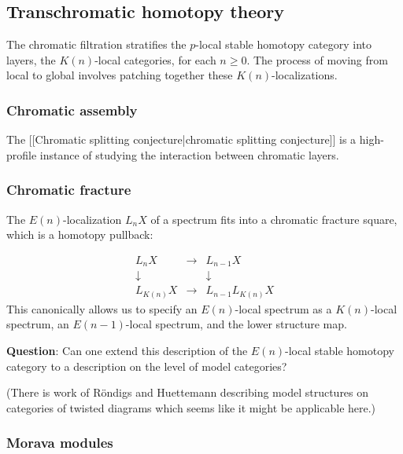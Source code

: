 \documentclass[12pt,titlepage]{article}
\theoremstyle{plain}
\theoremstyle{definition}
\theoremstyle{remark}
\begin{document}
\hypertarget{transchromatic_homotopy_theory_1}{}\subsection{{Transchromatic homotopy theory}}\label{transchromatic_homotopy_theory_1}

The chromatic filtration stratifies the $p$-local stable homotopy category into layers, the $K(n)$-local categories, for each $n \geq 0$. The process of moving from local to global involves patching together these $K(n)$-localizations.

\hypertarget{chromatic_assembly_2}{}\subsubsection{{Chromatic assembly}}\label{chromatic_assembly_2}

The [[Chromatic splitting conjecture|chromatic splitting conjecture]] is a high-profile instance of studying the interaction between chromatic layers.

\hypertarget{chromatic_fracture_3}{}\subsubsection{{Chromatic fracture}}\label{chromatic_fracture_3}

The $E(n)$-localization $L_n X$ of a spectrum fits into a chromatic fracture square, which is a homotopy pullback:

\begin{displaymath}
\begin{matrix}
L_n X & \to & L_{n-1} X \\
\downarrow && \downarrow \\
L_{K(n)} X & \to & L_{n-1} L_{K(n)} X
\end{matrix}
\end{displaymath}
This canonically allows us to specify an $E(n)$-local spectrum as a $K(n)$-local spectrum, an $E(n-1)$-local spectrum, and the lower structure map.

\textbf{Question}: Can one extend this description of the $E(n)$-local stable homotopy category to a description on the level of model categories?

(There is work of Röndigs and Huettemann describing model structures on categories of twisted diagrams which seems like it might be applicable here.)

\hypertarget{morava_modules_4}{}\subsubsection{{Morava modules}}\label{morava_modules_4}
\end{document}
